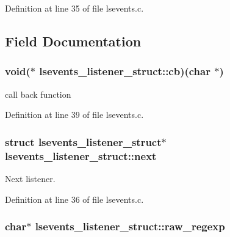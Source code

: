 Definition at line 35 of file lsevents.\-c.



\subsection{Field Documentation}
\hypertarget{structlsevents__listener__struct_a005906c1c9f0647e6ed1fb4592d8c5d0}{
\subsubsection[{cb}]{\setlength{\rightskip}{0pt plus 5cm}void($\ast$ lsevents\-\_\-listener\-\_\-struct\-::cb)(char $\ast$)}}\label{structlsevents__listener__struct_a005906c1c9f0647e6ed1fb4592d8c5d0}


call back function 



Definition at line 39 of file lsevents.\-c.

\hypertarget{structlsevents__listener__struct_a8aed9196b0deab84e018b96c0cc59305}{
\subsubsection[{next}]{\setlength{\rightskip}{0pt plus 5cm}struct {\bf lsevents\-\_\-listener\-\_\-struct}$\ast$ lsevents\-\_\-listener\-\_\-struct\-::next}}\label{structlsevents__listener__struct_a8aed9196b0deab84e018b96c0cc59305}


Next listener. 



Definition at line 36 of file lsevents.\-c.

\hypertarget{structlsevents__listener__struct_afffe7a6889fda47a3a7a91beefed9168}{
\subsubsection[{raw\-\_\-regexp}]{\setlength{\rightskip}{0pt plus 5cm}char$\ast$ lsevents\-\_\-listener\-\_\-struct\-::raw\-\_\-regexp}}\label{structlsevents__listener__struct_afffe7a6889fda47a3a7a91beefed9168}


